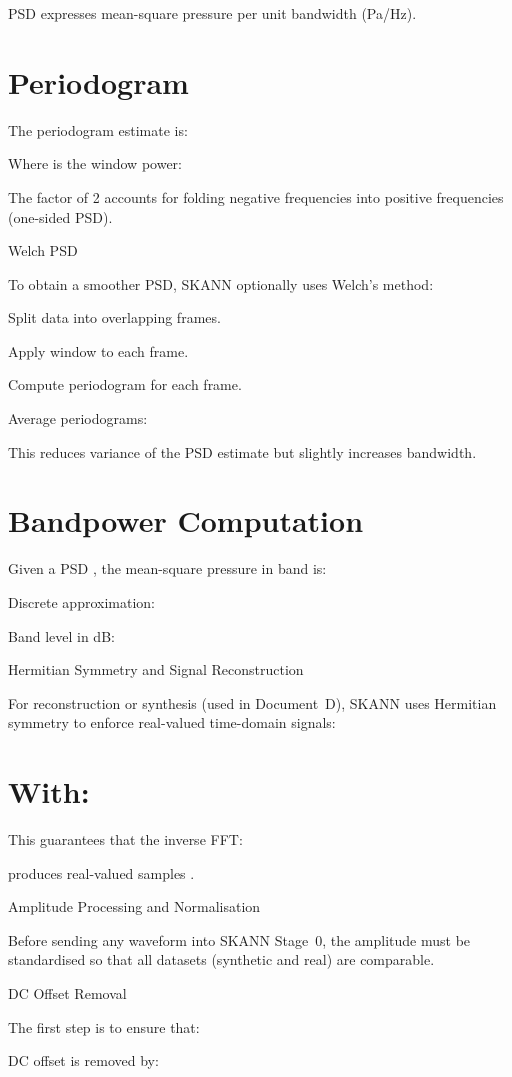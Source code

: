 \documentclass[12pt]{article}
\begin{document}
PSD expresses mean-square pressure per unit bandwidth (Pa/Hz).

\section*{Periodogram}
The periodogram estimate is:


Where  is the window power:


The factor of 2 accounts for folding negative frequencies into positive frequencies (one-sided PSD).

Welch PSD

To obtain a smoother PSD, SKANN optionally uses Welch’s method:

Split data into overlapping frames.

Apply window to each frame.

Compute periodogram for each frame.

Average periodograms:


This reduces variance of the PSD estimate but slightly increases bandwidth.

\section*{Bandpower Computation}
Given a PSD , the mean-square pressure in band  is:


Discrete approximation:


Band level in dB:


Hermitian Symmetry and Signal Reconstruction

For reconstruction or synthesis (used in Document D), SKANN uses Hermitian symmetry to enforce real-valued time-domain signals:


\section*{With:}

This guarantees that the inverse FFT:


produces real-valued samples .

Amplitude Processing and Normalisation

Before sending any waveform into SKANN Stage 0, the amplitude must be standardised so that all datasets (synthetic and real) are comparable.

DC Offset Removal

The first step is to ensure that:


DC offset is removed by:
\end{document}
